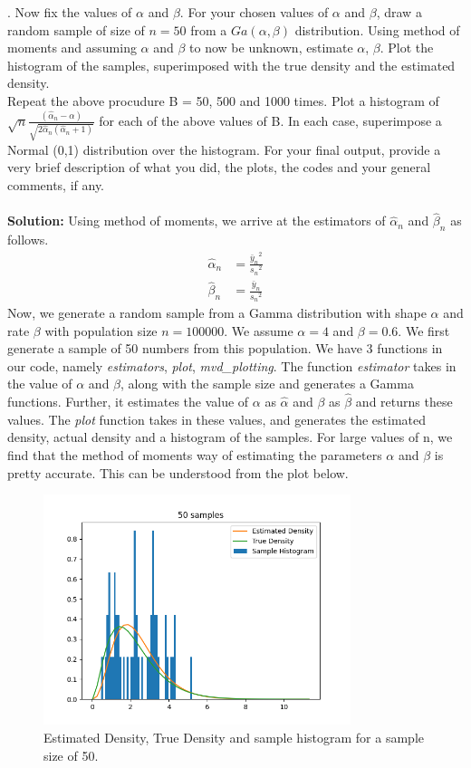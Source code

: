 \documentclass[11pt]{article}
\begin{document}
. Now fix the values of $\alpha$ and $\beta$. For your chosen values of $\alpha$ and $\beta$, draw a random sample of size of $n=50$ from a $Ga(\alpha, \beta)$ distribution. Using method of moments and assuming $\alpha$ and $\beta$ to now be unknown, estimate $\alpha$, $\beta$. Plot the histogram of the samples, superimposed with the true density and the estimated density. \\
Repeat the above procudure B = 50, 500 and 1000 times. Plot a histogram of $\sqrt{n}\frac{(\hat{\alpha}_{n} - \alpha)}{\sqrt{2 \hat{\alpha}_{n}(\hat{\alpha}_{n} + 1)}}$ for each of the above values of B. In each case, superimpose a Normal (0,1) distribution over the histogram. For your final output, provide a very brief description of what you did, the plots, the codes and your general comments, if any.\\ \\
\textbf{Solution:} Using method of moments, we arrive at the estimators of $\hat{\alpha}_{n}$ and $\hat{\beta}_{n}$ as follows.
\begin{equation}
  \nonumber
  \begin{aligned}
    \hat{\alpha}_{n} & = \frac{{\bar{y}_{n}}^{2}}{{s_{n}}^{2}}\\
    \hat{\beta}_{n} & = \frac{{\bar{y}_{n}}}{{s_{n}}^{2}}
  \end{aligned}
\end{equation}
Now, we generate a random sample from a Gamma distribution with shape $\alpha$ and rate $\beta$ with population size $n = 100000$. We assume $\alpha = 4$ and $\beta = 0.6$. We first generate a sample of 50 numbers from this population. We have 3 functions in our code, namely \emph{estimators}, \emph{plot}, \emph{mvd\_plotting}. The function \emph{estimator} takes in the value of $\alpha$ and $\beta$, along with the sample size and generates a Gamma functions. Further, it estimates the value of $\alpha$ as $\hat{\alpha}$ and $\beta$ as $\hat{\beta}$ and returns these values. The \emph{plot} function takes in these values, and generates the estimated density, actual density and a histogram of the samples. For large values of n, we find that the method of moments way of estimating the parameters $\alpha$ and $\beta$ is pretty accurate. This can be understood from the plot below.
\begin{figure}[H]
  \centering
  \includegraphics[width = 0.8\textwidth]{5.1.png}
  \caption{Estimated Density, True Density and sample histogram for a sample size of 50.}
\end{figure}
\end{document}
